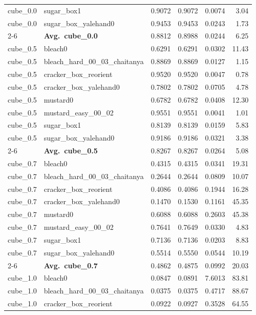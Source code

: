 \begin{longtable}{llrrrr}
  cube_0.0 & sugar\_box1 & 0.9072 & 0.9072 & 0.0074 & 3.04 \\
  cube_0.0 & sugar\_box\_yalehand0 & 0.9453 & 0.9453 & 0.0243 & 1.73 \\
  \cmidrule{2-6}
  & \textbf{Avg.~cube_0.0} & 0.8812 & 0.8988 & 0.0244 & 6.25 \\
  \midrule
  cube_0.5 & bleach0 & 0.6291 & 0.6291 & 0.0302 & 11.43 \\
  cube_0.5 & bleach\_hard\_00\_03\_chaitanya & 0.8869 & 0.8869 & 0.0127 & 1.15 \\
  cube_0.5 & cracker\_box\_reorient & 0.9520 & 0.9520 & 0.0047 & 0.78 \\
  cube_0.5 & cracker\_box\_yalehand0 & 0.7802 & 0.7802 & 0.0705 & 4.78 \\
  cube_0.5 & mustard0 & 0.6782 & 0.6782 & 0.0408 & 12.30 \\
  cube_0.5 & mustard\_easy\_00\_02 & 0.9551 & 0.9551 & 0.0041 & 1.01 \\
  cube_0.5 & sugar\_box1 & 0.8139 & 0.8139 & 0.0159 & 5.83 \\
  cube_0.5 & sugar\_box\_yalehand0 & 0.9186 & 0.9186 & 0.0321 & 3.38 \\
  \cmidrule{2-6}
  & \textbf{Avg.~cube_0.5} & 0.8267 & 0.8267 & 0.0264 & 5.08 \\
  \midrule
  cube_0.7 & bleach0 & 0.4315 & 0.4315 & 0.0341 & 19.31 \\
  cube_0.7 & bleach\_hard\_00\_03\_chaitanya & 0.2644 & 0.2644 & 0.0809 & 10.07 \\
  cube_0.7 & cracker\_box\_reorient & 0.4086 & 0.4086 & 0.1944 & 16.28 \\
  cube_0.7 & cracker\_box\_yalehand0 & 0.1470 & 0.1530 & 0.1161 & 45.35 \\
  cube_0.7 & mustard0 & 0.6088 & 0.6088 & 0.2603 & 45.38 \\
  cube_0.7 & mustard\_easy\_00\_02 & 0.7641 & 0.7649 & 0.0330 & 4.83 \\
  cube_0.7 & sugar\_box1 & 0.7136 & 0.7136 & 0.0203 & 8.83 \\
  cube_0.7 & sugar\_box\_yalehand0 & 0.5514 & 0.5550 & 0.0544 & 10.19 \\
  \cmidrule{2-6}
  & \textbf{Avg.~cube_0.7} & 0.4862 & 0.4875 & 0.0992 & 20.03 \\
  \midrule
  cube_1.0 & bleach0 & 0.0847 & 0.0891 & 7.6013 & 83.81 \\
  cube_1.0 & bleach\_hard\_00\_03\_chaitanya & 0.0375 & 0.0375 & 0.4717 & 88.67 \\
  cube_1.0 & cracker\_box\_reorient & 0.0922 & 0.0927 & 0.3528 & 64.55 \\

\end{longtable}
